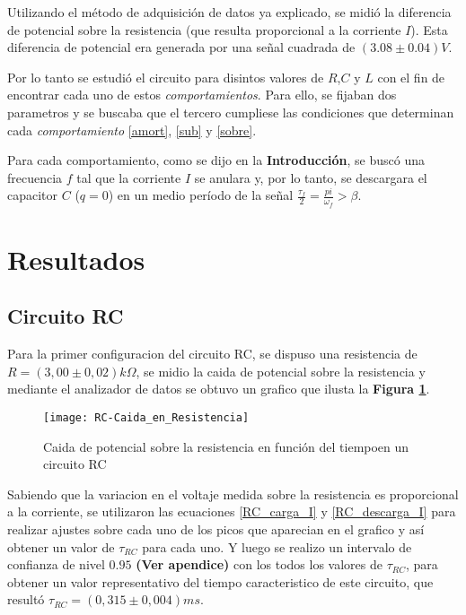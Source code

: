 \documentclass[11pt,a4paper]{article}
\begin{document}
Utilizando el método de adquisición de datos ya explicado, se midió la diferencia de potencial sobre la resistencia (que resulta proporcional a la corriente $I$). Esta diferencia de potencial era generada por una señal cuadrada de $(3.08 \pm 0.04)V$.

Por lo tanto se estudió el circuito para disintos valores de $R$,$C$ y $L$ con el fin de encontrar cada uno de estos \textit{comportamientos}. Para ello, se fijaban dos parametros y se buscaba que el tercero cumpliese las condiciones  que determinan cada \textit{comportamiento} \eqref{amort}, \eqref{sub} y \eqref{sobre}.

Para cada comportamiento, como se dijo en la \textbf{Introducción}, se buscó una frecuencia $f$ tal que la corriente $I$ se anulara y, por lo tanto, se descargara el capacitor $C$ ($q=0$) en un medio período de la señal $\frac{\tau_f}{2} = \frac{pi}{\omega_f} > \beta$.

\newpage


\section{Resultados}
\label{sec:discusion}

\subsection{Circuito RC}
Para la primer configuracion del circuito RC, se dispuso una resistencia de $R = (3,00\pm0,02)k\Omega$, se midio la caida de potencial sobre la resistencia y mediante el analizador de datos se obtuvo un grafico que ilusta la \textbf{Figura \ref{fig:RC-CR}}.

\begin{figure}[H]
\centering
\texttt{[image: RC-Caida\_en\_Resistencia]}
  \caption{Caida de potencial sobre la resistencia en función del tiempoen un circuito RC}
  \label{fig:RC-CR}
\end{figure}

Sabiendo que la variacion en el voltaje medida sobre la resistencia es proporcional a la corriente, se utilizaron las ecuaciones \eqref{RC_carga_I} y  \eqref{RC_descarga_I} para realizar ajustes sobre cada uno de los picos que aparecian en el grafico y así obtener un valor de $\tau_{RC}$ para cada uno. Y luego se realizo un intervalo de confianza de nivel $0.95$ \textbf{(Ver apendice)} con los todos los valores de $\tau_{RC}$, para obtener un valor representativo del tiempo caracteristico de este circuito, que resultó $\tau_{RC}=(0,315 \pm 0,004) ms$.
\end{document}
